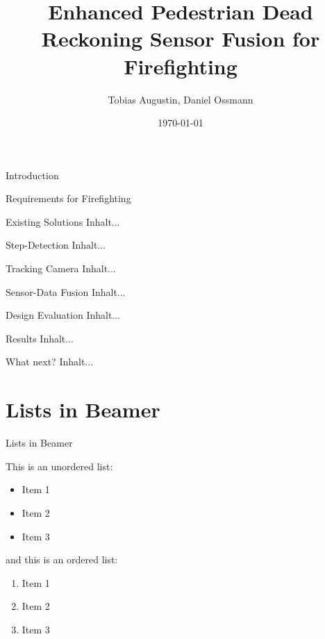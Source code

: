 \documentclass[aspectratio=1609]{beamer}
\title[Enhanced PDR for Firefighting]{Enhanced Pedestrian Dead Reckoning Sensor Fusion for Firefighting}
\author{Tobias Augustin, Daniel Ossmann}
\institute[]{University of Applied Science Munich, HM}
\date{\today}
\begin{document}
	
	{
	{
	
		\begin{frame}
			\titlepage
		\end{frame}}
	\usebackgroundtemplate{ }
	
	\begin{frame}{Introduction}
		
	\end{frame}}
	
	\begin{frame}{Requirements for Firefighting}
		
	\end{frame}
	
	\begin{frame}{Existing Solutions}
		Inhalt...
	\end{frame}
	
	\begin{frame}{Step-Detection}
		Inhalt...
	\end{frame}
	
	\begin{frame}{Tracking Camera}
		Inhalt...
	\end{frame}
	
	\begin{frame}{Sensor-Data Fusion}
		Inhalt...
	\end{frame}
	
	\begin{frame}{Design Evaluation}
		Inhalt...
	\end{frame}
	
	\begin{frame}{Results}
		Inhalt...
	\end{frame}
	
	\begin{frame}{What next?}
		Inhalt...
	\end{frame}
	\section{Lists in Beamer}
	\begin{frame}{Lists in Beamer}
		
		This is an unordered list:
		\begin{itemize}
			\item Item 1
			\item Item 2
			\item Item 3
		\end{itemize}
		
		and this is an ordered list:
		\begin{enumerate}
			\item Item 1
			\item Item 2
			\item Item 3
		\end{enumerate}
		
	\end{frame}
	
\end{document}
